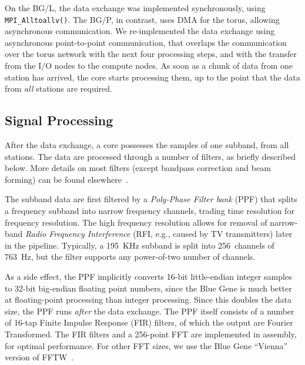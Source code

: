 \documentclass[conference]{IEEEtran}
\begin{document}
On the BG/L, the data exchange was implemented synchronously, using
\texttt{MPI\_Alltoallv()}.
The BG/P, in contrast, uses DMA for the torus, allowing asynchronous
communication.
We re-implemented the data exchange using asynchronous point-to-point
communication, that overlaps the communication over the torus network with 
the next four processing steps, and with the transfer from the I/O nodes to the compute nodes.
As soon as a chunk of data from one station has arrived, the core starts
processing them, up to the point that the data from \emph{all\/} stations
are required.

\subsection{Signal Processing}

After the data exchange, a core possesses the samples of one subband, from all
stations.
The data are processed through a number of filters, as briefly described below.
More details on most filters (except bandpass correction and beam forming)
can be found elsewhere~\cite{Romein:06}.

The subband data are first filtered by a \emph{Poly-Phase Filter bank\/} (PPF) that
splits a frequency subband into narrow frequency channels, trading time
resolution for frequency resolution.
The high frequency resolution allows for removal of narrow-band
\emph{Radio Frequency Interference\/} (RFI, e.g., caused by TV transmitters)
later in the pipeline.
Typically, a 195~KHz subband is split into 256~channels of 763~Hz, but the
filter supports any power-of-two number of channels.

As a side effect, the PPF implicitly converts 16-bit little-endian integer
samples to 32-bit big-endian floating point numbers, since the Blue Gene is
much better at floating-point processing than integer processing.
Since this doubles the data size, the PPF runs \emph{after\/} the data
exchange.
The PPF itself consists of a number of 16-tap Finite Impulse Response (FIR)
filters, of which the output are Fourier Transformed.
The FIR filters and a 256-point FFT are implemented in assembly, for optimal
performance.
For other FFT sizes, we use the Blue Gene ``Vienna'' version of
FFTW~\cite{Lorenz:05}.

\end{document}
